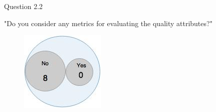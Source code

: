 \begin{shaded} Question 2.2 \end{shaded} \label{question:hybris_architecture/interview/question_2.2}
"Do you consider any metrics for evaluating the quality attributes?"

\begin{figure}[H]
\begin{center}
\includegraphics[scale=0.5]{figures/question2_2}
\label{fig:hybris_architecture/interview/question2-2}
\end{center}
\end{figure}
